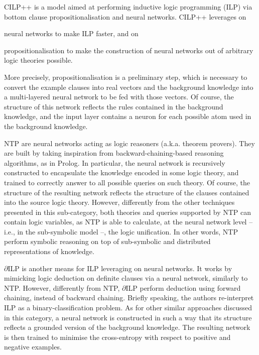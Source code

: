 \documentclass[12pt,a4paper,openright,twoside]{book}
\begin{document}
CILP++ \cite{Franca2014} is a model aimed at performing inductive logic programming (ILP) via bottom clause propositionalisation and neural networks.
%
CILP++ leverages on
%
\begin{inlinelist}
    \item neural networks to make ILP faster, and on
    \item propositionalisation to make the construction of neural networks out of arbitrary logic theories possible.
\end{inlinelist}
%
More precisely, propositionalisation \cite{Lachiche2010} is a preliminary step, which is necessary to convert the example clauses into real vectors and the background knowledge into a multi-layered neural network to be fed with those vectors.
%
Of course, the structure of this network reflects the rules contained in the background knowledge, and the input layer contains a neuron for each possible atom used in the background knowledge.

NTP \cite{rocktaschel2017} are neural networks acting as logic reasoners (a.k.a. theorem provers).
%
They are built by taking inspiration from backward-chaining-based reasoning algorithms, as in Prolog.
%
In particular, the neural network is recursively constructed to encapsulate the knowledge encoded in some logic theory, and trained to correctly answer to all possible queries on such theory.
%
Of course, the structure of the resulting network reflects the structure of the clauses contained into the source logic theory.
%
However, differently from the other techniques presented in this sub-category, both theories and queries supported by NTP can contain logic variables, as NTP is able to calculate, at the neural network level -- i.e., in the sub-symbolic model --, the logic unification.
%
In other words, NTP perform symbolic reasoning on top of sub-symbolic and distributed representations of knowledge.

$\partial$ILP \cite{Evans2017} is another means for ILP  leveraging on neural networks.
%
It works by mimicking logic deduction on definite clauses via a neural network, similarly to NTP.
%
However, differently from NTP, $\partial$ILP perform deduction using forward chaining, instead of backward chaining.
%
Briefly speaking, the authors re-interpret ILP as a binary-classification problem.
%
As for other similar approaches discussed in this category, a neural network is constructed in such a way that its structure reflects a grounded version of the background knowledge.
%
The resulting network is then trained to minimise the cross-entropy with respect to positive and negative examples.
\end{document}
